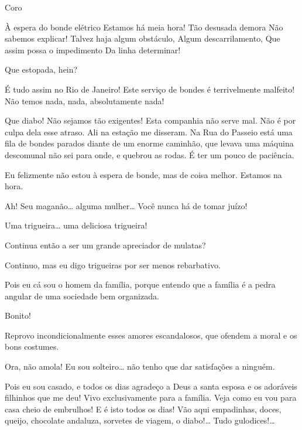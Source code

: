 

 Coro

 À espera do bonde elétrico
 Estamos há meia hora!
 Tão desusada demora
 Não sabemos explicar!
 Talvez haja algum obstáculo,
 Algum descarrilamento,
 Que assim possa o impedimento
 Da linha determinar!


 Que estopada, hein?

 É tudo assim no Rio de Janeiro! Este serviço de bondes é
terrivelmente malfeito! Não temos nada, nada, absolutamente nada!

 Que diabo! Não sejamos tão exigentes! Esta companhia não serve
mal. Não é por culpa dela esse atraso. Ali na estação me disseram. Na Rua
do Passeio está uma fila de bondes parados diante de um enorme caminhão, que
levava uma máquina descomunal não sei para onde, e quebrou as rodas. É ter
um pouco de paciência.

 Eu felizmente não estou à espera de bonde, mas de coisa
melhor.  Estamos na hora.

 Ah! Seu maganão\ldots{} alguma mulher\ldots{} Você nunca há de tomar
juízo!

 Uma trigueira\ldots{} uma deliciosa trigueira!

 Continua então a ser um grande apreciador de mulatas?

 Continuo, mas eu digo trigueiras por ser menos rebarbativo.

 Pois eu cá sou o homem da família, porque entendo que a família
é a pedra angular de uma sociedade bem organizada.

 Bonito!

 Reprovo incondicionalmente esses amores escandalosos, que
ofendem a moral e os bons costumes.

 Ora, não amola! Eu sou solteiro\ldots{} não tenho que dar
satisfações a ninguém.

 Pois eu sou casado, e todos os dias agradeço a Deus a santa
esposa e os adoráveis filhinhos que me deu! Vivo exclusivamente para a família.
Veja como eu vou para casa cheio de embrulhos! E é isto todos os dias! Vão aqui
empadinhas, doces, queijo, chocolate andaluza, sorvetes de viagem, o diabo!\ldots{} Tudo
gulodices!\ldots{}

